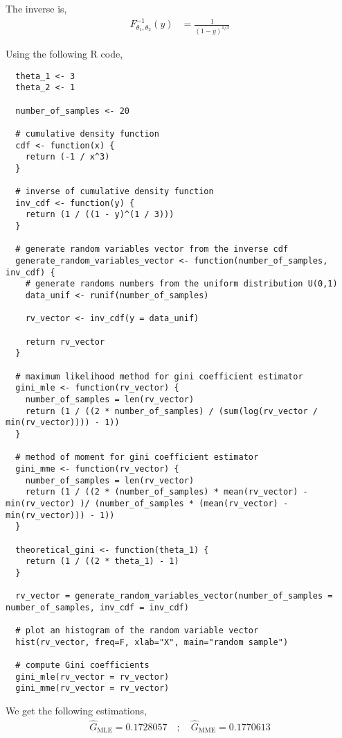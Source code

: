 \documentclass[10pt, a4paper, nofootinbib]{scrartcl}
\begin{document}
The inverse is, 
\begin{align*}
  F^{-1}_{\theta_1, \theta_2}(y) 
    &= \frac{1}{(1-y)^{1/3}}
\end{align*}

Using the following R code,
\begin{verbatim}
  theta_1 <- 3
  theta_2 <- 1
  
  number_of_samples <- 20
  
  # cumulative density function
  cdf <- function(x) {
    return (-1 / x^3)
  }
  
  # inverse of cumulative density function
  inv_cdf <- function(y) {
    return (1 / ((1 - y)^(1 / 3)))
  }
  
  # generate random variables vector from the inverse cdf
  generate_random_variables_vector <- function(number_of_samples, inv_cdf) {
    # generate randoms numbers from the uniform distribution U(0,1)
    data_unif <- runif(number_of_samples)
  
    rv_vector <- inv_cdf(y = data_unif)
  
    return rv_vector
  }
  
  # maximum likelihood method for gini coefficient estimator
  gini_mle <- function(rv_vector) {
    number_of_samples = len(rv_vector)
    return (1 / ((2 * number_of_samples) / (sum(log(rv_vector / min(rv_vector)))) - 1))
  } 
  
  # method of moment for gini coefficient estimator
  gini_mme <- function(rv_vector) {
    number_of_samples = len(rv_vector)
    return (1 / ((2 * (number_of_samples) * mean(rv_vector) - min(rv_vector) )/ (number_of_samples * (mean(rv_vector) - min(rv_vector))) - 1))
  }
  
  theoretical_gini <- function(theta_1) {
    return (1 / ((2 * theta_1) - 1)
  }
  
  rv_vector = generate_random_variables_vector(number_of_samples = number_of_samples, inv_cdf = inv_cdf)
  
  # plot an histogram of the random variable vector
  hist(rv_vector, freq=F, xlab="X", main="random sample")
  
  # compute Gini coefficients
  gini_mle(rv_vector = rv_vector)
  gini_mme(rv_vector = rv_vector)
\end{verbatim}

We get the following estimations,
\begin{equation}
  \begin{array}{rl}
    \hat{G}_{\text{MLE}} = 0.1728057 \quad ; \quad \hat{G}_{\text{MME}} = 0.1770613
  \end{array}
\end{equation}
\end{document}
